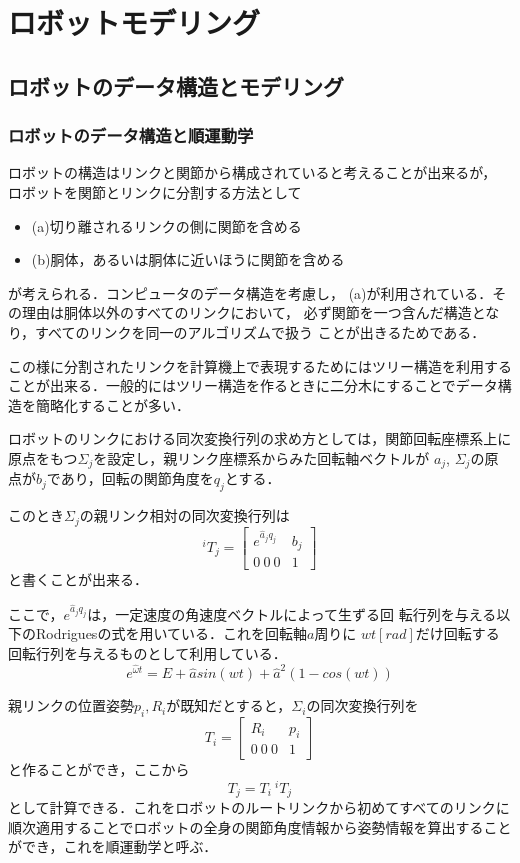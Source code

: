 \section{ロボットモデリング}

\subsection{ロボットのデータ構造とモデリング}

\subsubsection{ロボットのデータ構造と順運動学}

ロボットの構造はリンクと関節から構成されていると考えることが出来るが，
ロボットを関節とリンクに分割する方法として
\begin{itemize}
\item (a)切り離されるリンクの側に関節を含める
\item (b)胴体，あるいは胴体に近いほうに関節を含める
\end{itemize}
が考えられる．コンピュータのデータ構造を考慮し，
(a)が利用されている．その理由は胴体以外のすべてのリンクにおいて，
必ず関節を一つ含んだ構造となり，すべてのリンクを同一のアルゴリズムで扱う
ことが出きるためである．

この様に分割されたリンクを計算機上で表現するためにはツリー構造を利用する
ことが出来る．一般的にはツリー構造を作るときに二分木にすることでデータ構
造を簡略化することが多い．

ロボットのリンクにおける同次変換行列の求め方としては，関節回転座標系上に
原点をもつ$\Sigma_j$を設定し，親リンク座標系からみた回転軸ベクトルが
$a_j$, $\Sigma_j$の原点が$b_j$であり，回転の関節角度を$q_j$とする．

このとき$\Sigma_j$の親リンク相対の同次変換行列は
\[
 {}^iT_j =
 \left[
 \begin{array}{cc}
  e^{\hat{a}_jq_j} & b_j \\
  0~0~0 & 1
 \end{array}
 \right]
\]
と書くことが出来る．

ここで，$e^{\hat{a}_jq_j}$は，一定速度の角速度ベクトルによって生ずる回
転行列を与える以下のRodriguesの式を用いている．これを回転軸$a$周りに
$wt[rad]$だけ回転する回転行列を与えるものとして利用している．
\[
 e^{\hat{\omega}t} = E + \hat{a} sin (wt) + \hat{a}^2 (1 - cos(wt))
\]

親リンクの位置姿勢$p_i, R_i$が既知だとすると，$\Sigma_i$の同次変換行列を
\[
 T_i =
 \left[
 \begin{array}{cc}
  R_i & p_i \\
  0~0~0 & 1
 \end{array}
 \right]
\]
と作ることができ，ここから
\[
 T_j = T_i ~ {}^iT_j
\]
として計算できる．これをロボットのルートリンクから初めてすべてのリンクに
順次適用することでロボットの全身の関節角度情報から姿勢情報を算出すること
ができ，これを順運動学と呼ぶ．

